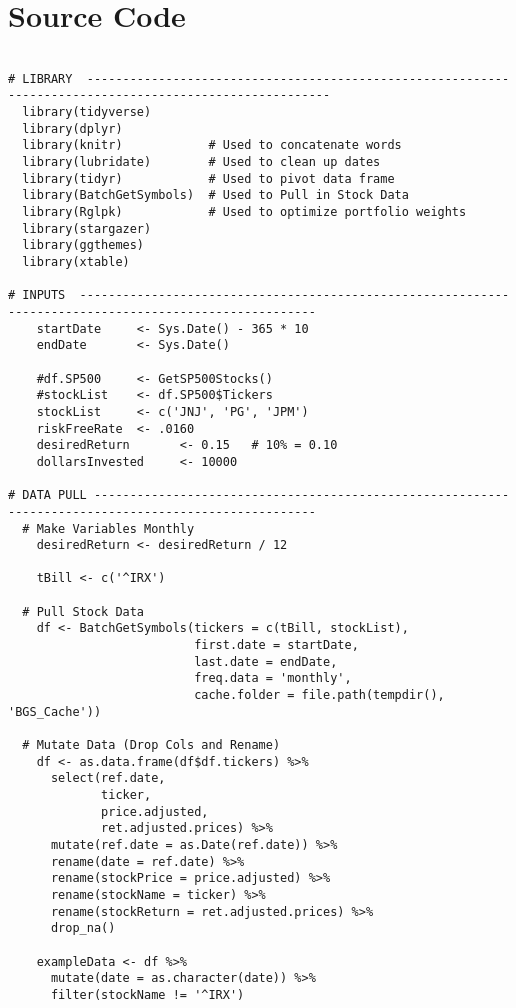 \documentclass[12pt,english]{article}
\begin{document}
    \newpage\section{Source Code}
    
        \begin{lstlisting}

# LIBRARY  --------------------------------------------------------------------------------------------------------
  library(tidyverse)
  library(dplyr)
  library(knitr)            # Used to concatenate words
  library(lubridate)        # Used to clean up dates
  library(tidyr)            # Used to pivot data frame
  library(BatchGetSymbols)  # Used to Pull in Stock Data
  library(Rglpk)            # Used to optimize portfolio weights
  library(stargazer)
  library(ggthemes)
  library(xtable)  

# INPUTS  -------------------------------------------------------------------------------------------------------
    startDate     <- Sys.Date() - 365 * 10
    endDate       <- Sys.Date()
    
    #df.SP500     <- GetSP500Stocks()
    #stockList    <- df.SP500$Tickers
    stockList     <- c('JNJ', 'PG', 'JPM')
    riskFreeRate  <- .0160
    desiredReturn       <- 0.15   # 10% = 0.10
    dollarsInvested     <- 10000
  
# DATA PULL -----------------------------------------------------------------------------------------------------
  # Make Variables Monthly
    desiredReturn <- desiredReturn / 12

    tBill <- c('^IRX')
    
  # Pull Stock Data
    df <- BatchGetSymbols(tickers = c(tBill, stockList), 
                          first.date = startDate,
                          last.date = endDate, 
                          freq.data = 'monthly',
                          cache.folder = file.path(tempdir(), 'BGS_Cache'))
    
  # Mutate Data (Drop Cols and Rename)
    df <- as.data.frame(df$df.tickers) %>%
      select(ref.date,
             ticker,
             price.adjusted,
             ret.adjusted.prices) %>%
      mutate(ref.date = as.Date(ref.date)) %>%
      rename(date = ref.date) %>%
      rename(stockPrice = price.adjusted) %>%
      rename(stockName = ticker) %>%
      rename(stockReturn = ret.adjusted.prices) %>%
      drop_na()
    
    exampleData <- df %>%
      mutate(date = as.character(date)) %>%
      filter(stockName != '^IRX')
    

\end{lstlisting}
\end{document}
